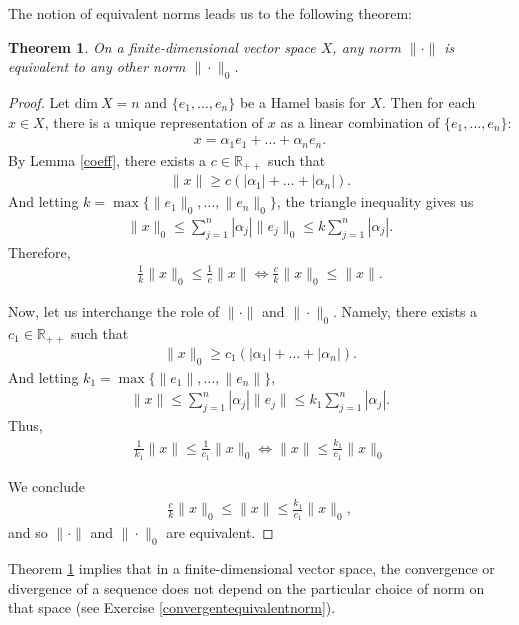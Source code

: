 \documentclass[11pt]{article}
\theoremstyle{mystyle}
\newtheorem{thm}{Theorem}[section]
\newcommand{\0}{\mathbf{0}}
\begin{document}
The notion of equivalent norms leads us to the following theorem:
\begin{thm}\label{allequivalent}
On a finite-dimensional vector space $X$, any norm $\|\cdot\|$ is equivalent to any other norm $\|\cdot\|_0$.
\end{thm}
\begin{proof}
Let $\text{dim} \ X = n$ and $\{e_1, \ldots, e_n\}$ be a Hamel basis for $X$. Then for each $x \in X$, there is a unique representation of $x$ as a linear combination of $\{e_1, \ldots, e_n\}$:
\begin{align*}
    x = \alpha_1 e_1 + \ldots + \alpha_n e_n.
\end{align*}
By Lemma \ref{coeff}, there exists a $c \in \mathbb{R}_{++}$ such that
\begin{align*}
    \|x\| \geq c(|\alpha_1| + \ldots + |\alpha_n|).
\end{align*}
And letting $k = \max\{\|e_1\|_0, \ldots, \|e_n\|_0\}$, the triangle inequality gives us
\begin{align*}
    \|x\|_0 \leq \sum_{j=1}^n|\alpha_j| \|e_j\|_0 \leq k \sum_{j=1}^n|\alpha_j|.
\end{align*}
Therefore,
\begin{align*}
    \frac{1}{k}\|x\|_0 \leq \frac{1}{c}\|x\| \iff \frac{c}{k}\|x\|_0 \leq \|x\|.
\end{align*}

Now, let us interchange the role of $\|\cdot\|$ and $\|\cdot\|_0$. Namely, there exists a $c_1 \in \mathbb{R}_{++}$ such that
\begin{align*}
    \|x\|_0 \geq c_1 (|\alpha_1| + \ldots + |\alpha_n|).
\end{align*}
And letting $k_1 = \max\{\|e_1\|, \ldots, \|e_n\|\}$,
\begin{align*}
    \|x\| \leq \sum_{j=1}^n |\alpha_j| \|e_j\| \leq k_1 \sum_{j=1}^n |\alpha_j|.
\end{align*}
Thus,
\begin{align*}
    \frac{1}{k_1}\|x\| \leq \frac{1}{c_1}\|x\|_0 \iff \|x\| \leq \frac{k_1}{c_1} \|x\|_0
\end{align*}

We conclude
\begin{align*}
   \frac{c}{k} \|x\|_0 \leq \|x\| \leq \frac{k_1}{c_1} \|x\|_0,
\end{align*}
and so $\|\cdot\|$ and $\|\cdot\|_0$ are equivalent.
\end{proof}

Theorem \ref{allequivalent} implies that in a finite-dimensional vector space, the convergence or divergence of a sequence does not depend on the particular choice of norm on that space (see Exercise \ref{convergentequivalentnorm}).
\end{document}

